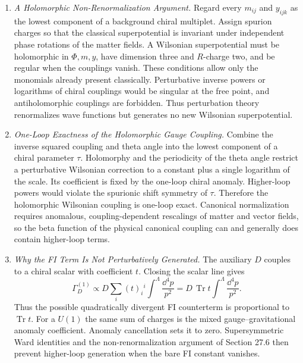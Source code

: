 \begin{enumerate}
  \begin{enumerate}
    \item \emph{A Holomorphic Non-Renormalization Argument.}
    Regard every \(m_{ij}\) and \(y_{ijk}\) as the lowest component of a
      background chiral multiplet.  Assign spurion charges so that the
      classical superpotential is invariant under independent phase rotations
      of the matter fields.  A Wilsonian superpotential must be holomorphic in
      \(\Phi,m,y\), have dimension three and \(R\)-charge two, and be regular
      when the couplings vanish.  These conditions allow only the monomials
      already present classically.  Perturbative inverse powers or logarithms
      of chiral couplings would be singular at the free point, and
      antiholomorphic couplings are forbidden.  Thus perturbation theory
      renormalizes wave functions but generates no new Wilsonian
      superpotential.
    \item \emph{One-Loop Exactness of the Holomorphic Gauge Coupling.}
    Combine the inverse squared coupling and theta angle into the lowest
      component of a chiral parameter \(\tau\).  Holomorphy and the periodicity
      of the theta angle restrict a perturbative Wilsonian correction to a
      constant plus a single logarithm of the scale.  Its coefficient is fixed
      by the one-loop chiral anomaly.  Higher-loop powers would violate the
      spurionic shift symmetry of \(\tau\).  Therefore the holomorphic
      Wilsonian coupling is one-loop exact.  Canonical normalization requires
      anomalous, coupling-dependent rescalings of matter and vector fields, so
      the beta function of the physical canonical coupling can and generally
      does contain higher-loop terms.
    \item \emph{Why the FI Term Is Not Perturbatively Generated.}
    The auxiliary \(D\) couples to a chiral scalar with coefficient \(t\).
      Closing the scalar line gives
      \[
        \Gamma_D^{(1)}\propto
          D\sum_i(t)_i{}^i\int^\Lambda\frac{\dd^4p}{p^2}
          =D\,\operatorname{Tr}t\int^\Lambda\frac{\dd^4p}{p^2}.
      \]
      Thus the possible quadratically divergent FI counterterm is
      proportional to \(\operatorname{Tr}t\).  For a \(U(1)\) the same sum of
      charges is the mixed gauge--gravitational anomaly coefficient.  Anomaly
      cancellation sets it to zero.  Supersymmetric Ward identities and the
      non-renormalization argument of Section 27.6 then prevent higher-loop
      generation when the bare FI constant vanishes.
  \end{enumerate}


\end{enumerate}
